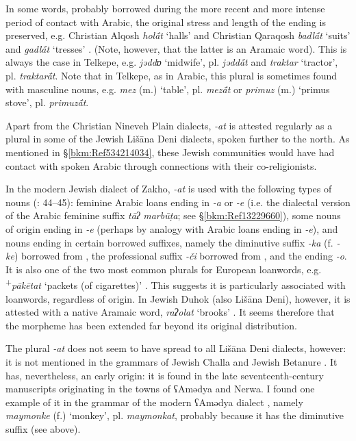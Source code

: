 \documentclass[output=paper]{langsci/langscibook}
\begin{document}
In some words, probably borrowed during the more recent and more intense period of contact with Arabic, the original {stress} and length of the ending is preserved, e.g. Christian Alqosh \textit{hol\'{ā}t} ‘halls’ and Christian Qaraqosh \textit{badl\'{ā}t} ‘suits’ and \textit{gadl\'{ā}t} ‘tresses’ \citep[194]{Khan2002}. (Note, however, that the latter is an Aramaic word). This is always the case in Telkepe, e.g. \textit{jəddɒ} ‘midwife’, pl. \textit{jədd\'{ā}t} and \textit{traktar} ‘tractor’, pl. \textit{traktar\'{ā}t}. Note that in Telkepe, as in Arabic, this plural is sometimes found with masculine nouns, e.g. \textit{mez} (m.) ‘table’, pl. \textit{mez\'{ā}t} or \textit{primuz} (m.) ‘primus stove’, pl. \textit{primuz\'{ā}t}.

Apart from the Christian Nineveh Plain dialects, \textit{\nobreakdash-at} is attested regularly as a plural in some of the Jewish Lišāna Deni dialects, spoken further to the north. As mentioned in §\ref{bkm:Ref534214034}, these Jewish communities would have had contact with spoken Arabic through connections with their co-religionists.

In the modern Jewish dialect of Zakho, \textit{\nobreakdash-at} is used with the following types of nouns (\citealt{Sabar2002}: 44–45): feminine Arabic loans ending in \textit{\nobreakdash-a} or \textit{\nobreakdash-e} (i.e. the dialectal version of the Arabic feminine suffix \textit{tāʔ} \textit{marbūṭa}; see §\ref{bkm:Ref13229660}), some nouns of  origin ending in \textit{\nobreakdash-e} (perhaps by {analogy} with Arabic loans ending in \textit{\nobreakdash-e}), and nouns ending in certain borrowed suffixes, namely the {diminutive} suffix \textit{\nobreakdash-ka} (f. \textit{\nobreakdash-ke}) borrowed from , the professional suffix \textit{{}-či} borrowed from , and the ending \textit{\nobreakdash-o}. It is also one of the two most common plurals for European {loanwords}, e.g. \textsuperscript{+}\textit{pākētat} ‘packets (of cigarettes)’ \citep[57]{Sabar1990}. This suggests it is particularly associated with {loanwords}, regardless of origin. In Jewish Duhok (also Lišāna Deni), however, it is attested with a native Aramaic word, \textit{raʔolat} ‘brooks’ \citep[45]{Sabar2002}. It seems therefore that the morpheme has been extended far beyond its original distribution.

The plural \textit{{}-at} does not seem to have spread to all Lišāna Deni dialects, however: it is not mentioned in the grammars of Jewish Challa \citep{Fassberg2010} and Jewish Betanure \citep{Mutzafi2008}. It has, nevertheless, an early origin: it is found in the late seventeenth-century manuscripts originating in the towns of ʕAmədya and Nerwa. I found one example of it in the grammar of the modern ʕAmədya dialect \citep[70]{Greenblatt2011}, namely \textit{maymonke} (f.) ‘monkey’, pl. \textit{maymonkat}, probably because it has the  {diminutive} suffix (see above).
\end{document}
